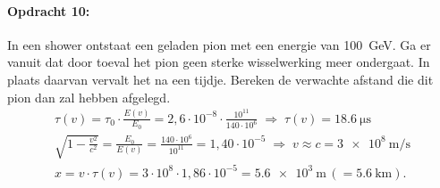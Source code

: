 \begin{minipage}[t]{1\columnwidth}
\paragraph{Opdracht 10:}
In een shower ontstaat een geladen pion met een energie van
\SI{100}{\giga\electronvolt}. Ga er vanuit dat door toeval het pion geen
sterke wisselwerking meer ondergaat. In plaats daarvan vervalt het na
een tijdje. Bereken de verwachte afstand die dit pion dan zal hebben
afgelegd.
\begin{eqnarray}  
    \tau (v) = \tau_0 \cdot \frac{E(v)}{E_0}
    = 2,6 \cdot 10^{-8} \cdot \frac{10^{11}}{140 \cdot 10^6}
    \;\Rightarrow\; \tau (v) = \SI{18,6}{\micro\second} \nonumber \\
    \sqrt{1-\frac{v^2}{c^2}} = \frac{E_0}{E(v)}
    = \frac{140 \cdot 10^6}{10^{11}} = 1,40 \cdot 10^{-5}
    \;\Rightarrow\; v \approx c = \SI{3e8}{\meter\per\second} \nonumber \\ 
    x = v \cdot \tau(v) = 3 \cdot 10^8 \cdot 1,86 \cdot 10^{-5}
    = \SI{5,6e3}{\meter}\, (=\SI{5,6}{\kilo\meter}). \nonumber
\end{eqnarray}

\end{minipage}


